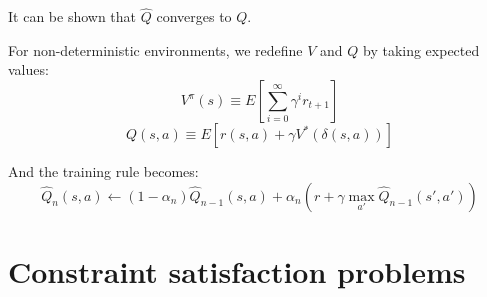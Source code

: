 \documentclass[12pt]{article}
\begin{document}
\begin{enumerate}[label=\textbf{RL.\arabic*}]
          It can be shown that $\hat{Q}$ converges to $Q$.

          For non-deterministic environments, we redefine $V$ and $Q$ by taking expected values:
          \[
              V^\pi(s) \equiv E[\sum_{i=0}^{\infty} \gamma^i r_{t+1}]
          \]
          \[
              Q(s,a) \equiv E[r(s,a) + \gamma V^*(\delta(s,a))]
          \]

          And the training rule becomes:
          \[
              \hat{Q}_n(s,a) \leftarrow (1-\alpha_n)\hat{Q}_{n-1}(s,a) + \alpha_n(r + \gamma\max_{a'}\hat{Q}_{n-1}(s',a'))
          \]

\end{enumerate}
\section{Constraint satisfaction problems}
\end{document}

